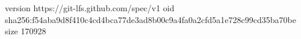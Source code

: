 version https://git-lfs.github.com/spec/v1
oid sha256:f54aba9d8f410c4cd4bca77de3ad8b00c9a4fa0a2cfd5a1e728c99cd35ba70be
size 170928
